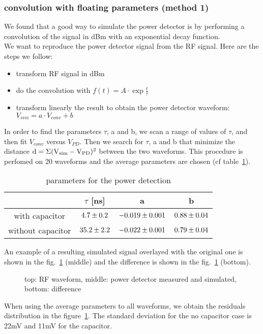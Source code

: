 \subsubsection{convolution with floating parameters (method 1)}
We  found  that a  good  way  to simulate  the  power  detector is  by
performing  a convolution  of the  signal in  dBm with  an exponential
decay function.   \\ We  want to reproduce  the power  detector signal
from the RF signal. Here are the steps we follow:
\begin{itemize}
\item transform RF signal in dBm
\item do the convolution with $f(t) = A\cdot \exp{\frac{t}{\tau}}$
\item  transform linearly  the  result to  obtain  the power  detector
  waveform: $V_{sim} = a\cdot V_{conv} + b$
\end{itemize}
In order to  find the parameters $\tau$,  a and b, we scan  a range of
values of  $\tau$, and then  fit $V_{conv}$ versus $V_{PD}$.   Then we
search for $\tau$, a and b  that minimize the distance $\rm d = \Sigma
(V_{sim} -  V_{PD})^2$ between the  two waveforms.  This  procedure is
perfomed on  20 waveforms  and the average  parameters are  chosen (cf
table~\ref{tab:method1tab}).
\begin{table}[h!]
  \centering
  \caption{parameters for the power detection}
  \label{tab:method1tab}
  \begin{tabular}{|c||c|c|c|}
    \hline
    & $\tau$ [ns] & a & b \\
    \hline
    with capacitor & $\rm 4.7 \pm 0.2$ & $\rm -0.019 \pm 0.001 $ & $\rm 0.88 \pm 0.04 $ \\
    \hline
    without capacitor & $\rm 35.2 \pm 2.2$ & $\rm -0.022 \pm 0.001 $  & $\rm 0.79 \pm 0.04 $\\
    \hline
  \end{tabular}
\end{table}
An example of a resulting simulated signal overlayed with the original
one is shown in the fig.~\ref{fig:m1ex} (middle) and the difference is
shown in the fig.~\ref{fig:m1ex} (bottom).
\begin{figure}[!ht]
  \centering
  \hspace*{-3ex}
  \caption{top:  RF  waveform,  middle:  power detector  measured  and
    simulated, bottom: difference}
  \label{fig:m1ex}
\end{figure}
When  using the  average parameters  to all  waveforms, we  obtain the
residuals distribution in the figure~\ref{fig:m1ex}. The standard
deviation  for  the  no  capacitor  case  is 22mV  and  11mV  for  the
capacitor.

